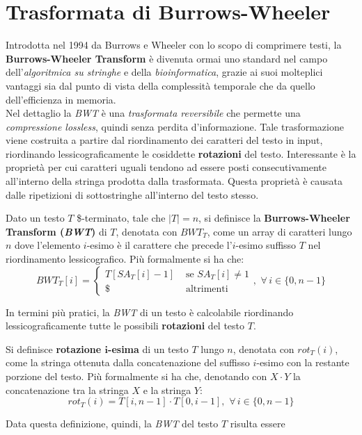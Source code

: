 \section{Trasformata di Burrows-Wheeler}
\label{secbwt}
Introdotta nel 1994 da Burrows e Wheeler con lo scopo di comprimere testi, la
\textbf{Burrows-Wheeler Transform} \cite{bwt} è divenuta ormai uno standard nel
campo dell'\textit{algoritmica su stringhe} e della \textit{bioinformatica},
grazie ai suoi molteplici vantaggi sia dal punto di vista della complessità
temporale che da quello dell'efficienza in memoria.\\
Nel dettaglio la \textit{BWT} è una \textit{trasformata reversibile} che
permette una \textit{compressione lossless}, quindi senza perdita
d'informazione. Tale trasformazione viene costruita a partire dal riordinamento
dei caratteri del testo in input, riordinando lessicograficamente le cosiddette
\textbf{rotazioni} del testo. Interessante è la proprietà per cui caratteri
uguali tendono ad essere posti consecutivamente all'interno della stringa
prodotta dalla trasformata. Questa proprietà è causata dalle ripetizioni di
sottostringhe all'interno del testo stesso.
\begin{definizione}
  Dato un testo $T$ \$-terminato, tale che $|T|=n$, si definisce la
  \textbf{Burrows-Wheeler Transform (\textit{BWT})} di $T$, denotata con
  $BWT_T$, come un array di caratteri lungo $n$ dove l'elemento $i$-esimo è il
  carattere che precede l'$i$-esimo suffisso $T$ nel riordinamento
  lessicografico. Più formalmente si ha che:
  \[BWT_T[i]=
    \begin{cases}
      T[SA_T[i]-1]&\mbox{ se } SA_T[i]\neq 1\\
      \$&\mbox{ altrimenti}
    \end{cases},\,\, \forall\, i\in\{0,n-1\}
  \]
\end{definizione}
In termini più pratici, la \textit{BWT} di un testo è calcolabile riordinando
lessicograficamente tutte le possibili \textbf{rotazioni} del testo $T$.
\begin{definizione}
  Si definisce \textbf{rotazione $\mathbf{i}$-esima} di
  un testo $T$ lungo $n$, denotata con $rot_T(i)$, come la stringa ottenuta
  dalla concatenazione 
  del suffisso $i$-esimo con la restante porzione del testo. Più formalmente si
  ha che, denotando con $X\cdot Y$ la concatenazione tra
  la stringa $X$ e la stringa $Y$:
  \[rot_T(i)=T[i,n-1]\cdot T[0,i-1],\,\,\forall\, i\in\{0,n-1\}\]
\end{definizione}
Data questa definizione, quindi, la \textit{BWT} del testo $T$ risulta essere
